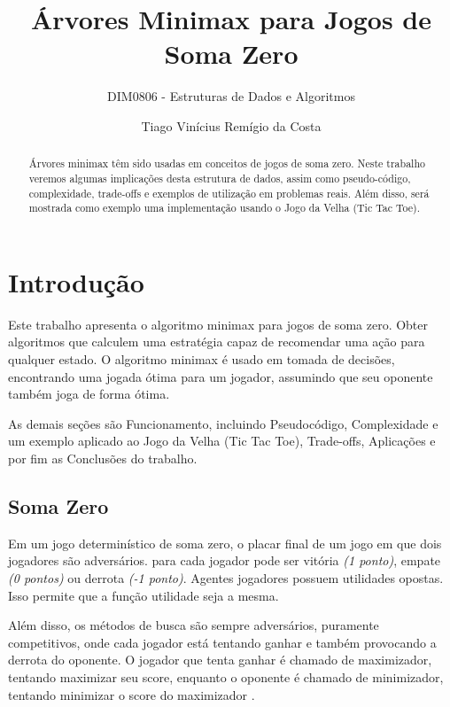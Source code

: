 \documentclass[sigplan,screen]{acmart}
\begin{document}
\title{Árvores Minimax para Jogos de Soma Zero}
\subtitle{DIM0806 - Estruturas de Dados e Algoritmos}

\author{Tiago Vinícius Remígio da Costa}

\begin{abstract}
  Árvores minimax têm sido usadas em conceitos de jogos de soma zero. 
  Neste trabalho veremos algumas implicações desta estrutura de dados, 
  assim como pseudo-código, complexidade, trade-offs e exemplos de utilização em problemas reais. 
  Além disso, será mostrada como exemplo uma implementação usando o Jogo da Velha (Tic Tac Toe).
\end{abstract}


\maketitle
\pagestyle{plain}

\section{Introdução}
Este trabalho apresenta o algoritmo minimax \cite{russel2010} para jogos de soma zero. 
Obter algoritmos que calculem uma estratégia capaz de recomendar uma ação para qualquer estado. O algoritmo minimax é usado em tomada de decisões, encontrando uma jogada ótima para um jogador, assumindo que seu oponente também joga de forma ótima.

As demais seções são Funcionamento, incluindo Pseudocódigo, Complexidade e um exemplo aplicado ao Jogo da Velha (Tic Tac Toe), Trade-offs, Aplicações e por fim as Conclusões do trabalho.

\subsection{Soma Zero}
Em um jogo determinístico de soma zero, o placar final de um jogo em que dois jogadores são adversários.
para cada jogador pode ser vitória {\itshape(1 ponto)}, empate {\itshape(0 pontos)} ou derrota {\itshape(-1 ponto)}. 
Agentes jogadores possuem utilidades opostas. Isso permite que a função utilidade seja a mesma.

Além disso, os métodos de busca são sempre adversários, puramente competitivos, onde cada jogador está tentando ganhar e também provocando a derrota do oponente. O jogador que tenta ganhar é chamado de maximizador, tentando maximizar seu score, enquanto o oponente é chamado de minimizador, tentando minimizar o score do maximizador \cite{Aradhya01}.
\end{document}
